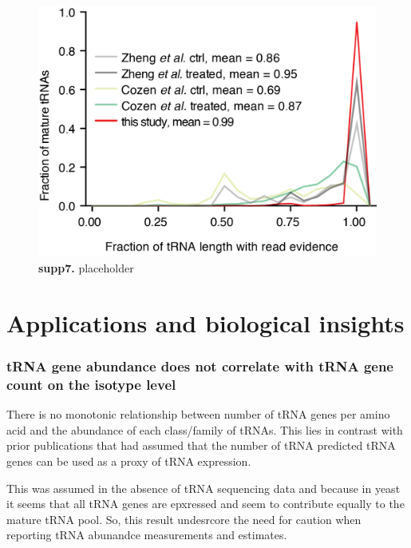 \documentclass[12pt]{rockefeller}
\begin{document}
\begin{figure}[!ht]%
\centering
\includegraphics{supp7.png}%
\caption[supp7]
{\textbf{supp7.}
placeholder}
\centering
\label{supp7}%
\end{figure}

\section{Applications and biological insights}\label{applications}

\subsubsection{tRNA gene abundance does not correlate with tRNA gene count on the isotype level}

There is no monotonic relationship between number of tRNA genes per amino acid and the abundance of each class/family of tRNAs. This lies in contrast with prior publications that had assumed that the number of tRNA predicted tRNA genes can be used as a proxy of tRNA expression. 

This was assumed in the absence of tRNA sequencing data and because in yeast it seems that all tRNA genes are epxressed and seem to contribute equally to the mature tRNA pool. 
So, this result undesrcore the need for caution when reporting tRNA abunandce measurements and estimates.
\end{document}
